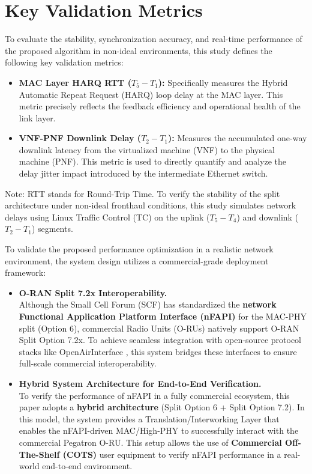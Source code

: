 \documentclass[../my_ntust_thesis.tex]{subfiles}
\begin{document}
\section{Key Validation Metrics}
\label{subsec:D_metrics}
To evaluate the stability, synchronization accuracy, and real-time performance of the proposed algorithm in non-ideal environments, this study defines the following key validation metrics:
\begin{itemize}
\item \textbf{MAC Layer HARQ RTT ($T_5 - T_1$):} Specifically measures the Hybrid Automatic Repeat Request (HARQ) loop delay at the MAC layer. This metric precisely reflects the feedback efficiency and operational health of the link layer.
\item \textbf{VNF-PNF Downlink Delay ($T_2 - T_1$):} Measures the accumulated one-way downlink latency from the virtualized machine (VNF) to the physical machine (PNF). This metric is used to directly quantify and analyze the delay jitter impact introduced by the intermediate Ethernet switch.
\end{itemize}
Note: RTT stands for Round-Trip Time. To verify the stability of the split architecture under non-ideal fronthaul conditions, this study simulates network delays using Linux Traffic Control (TC) on the uplink ($T_5 - T_4$) and downlink ($T_2 - T_1$) segments.

To validate the proposed performance optimization in a realistic network environment, the system design utilizes a commercial-grade deployment framework:
\begin{itemize}
\item \textbf{O-RAN Split 7.2x Interoperability.} \\
      Although the Small Cell Forum (SCF) has standardized the \textbf{network Functional Application Platform Interface (nFAPI)} \cite{douros2018nfapi} for the MAC-PHY split (Option 6), commercial Radio Units (O-RUs) natively support O-RAN Split Option 7.2x. To achieve seamless integration with open-source protocol stacks like OpenAirInterface \cite{wang2022opensource}, this system bridges these interfaces to ensure full-scale commercial interoperability.
\item \textbf{Hybrid System Architecture for End-to-End Verification.} \\
      To verify the performance of nFAPI in a fully commercial ecosystem, this paper adopts a \textbf{hybrid architecture} (Split Option 6 + Split Option 7.2). In this model, the system provides a Translation/Interworking Layer that enables the nFAPI-driven MAC/High-PHY to successfully interact with the commercial Pegatron O-RU. This setup allows the use of \textbf{Commercial Off-The-Shelf (COTS)} user equipment to verify nFAPI performance in a real-world end-to-end environment.
\end{itemize}
\end{document}
